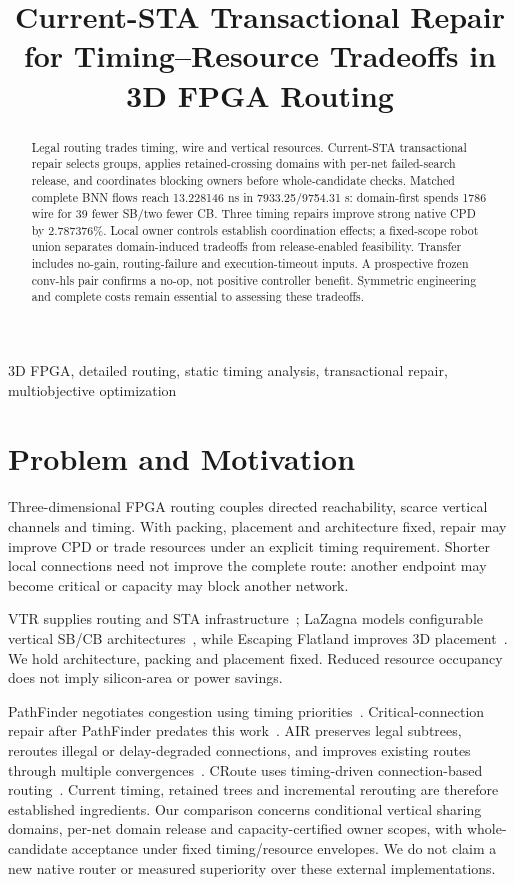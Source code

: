 \documentclass[conference,10pt]{IEEEtran}
\title{Current-STA Transactional Repair for Timing--Resource Tradeoffs in 3D FPGA Routing}
\author{\IEEEauthorblockN{Anonymous development manuscript}}
\begin{document}
\maketitle
\begin{abstract}
Legal routing trades timing, wire and vertical resources. Current-STA transactional repair selects groups, applies retained-crossing domains with per-net failed-search release, and coordinates blocking owners before whole-candidate checks. Matched complete BNN flows reach 13.228146 ns in 7933.25/9754.31 s: domain-first spends 1786 wire for 39 fewer SB/two fewer CB. Three timing repairs improve strong native CPD by 2.787376\%. Local owner controls establish coordination effects; a fixed-scope robot union separates domain-induced tradeoffs from release-enabled feasibility. Transfer includes no-gain, routing-failure and execution-timeout inputs. A prospective frozen conv-hls pair confirms a no-op, not positive controller benefit. Symmetric engineering and complete costs remain essential to assessing these tradeoffs.
\end{abstract}
\begin{IEEEkeywords}
3D FPGA, detailed routing, static timing analysis, transactional repair, multiobjective optimization
\end{IEEEkeywords}

\section{Problem and Motivation}
Three-dimensional FPGA routing couples directed reachability, scarce vertical channels and timing. With packing, placement and architecture fixed, repair may improve CPD or trade resources under an explicit timing requirement. Shorter local connections need not improve the complete route: another endpoint may become critical or capacity may block another network.

VTR supplies routing and STA infrastructure~\cite{vtr9paper}; LaZagna models configurable vertical SB/CB architectures~\cite{lazagna}, while Escaping Flatland improves 3D placement~\cite{flatland}. We hold architecture, packing and placement fixed. Reduced resource occupancy does not imply silicon-area or power savings.

PathFinder negotiates congestion using timing priorities~\cite{pathfinder}. Critical-connection repair after PathFinder predates this work~\cite{liurepair}. AIR preserves legal subtrees, reroutes illegal or delay-degraded connections, and improves existing routes through multiple convergences~\cite{air}. CRoute uses timing-driven connection-based routing~\cite{croute}. Current timing, retained trees and incremental rerouting are therefore established ingredients. Our comparison concerns conditional vertical sharing domains, per-net domain release and capacity-certified owner scopes, with whole-candidate acceptance under fixed timing/resource envelopes. We do not claim a new native router or measured superiority over these external implementations.
\end{document}
